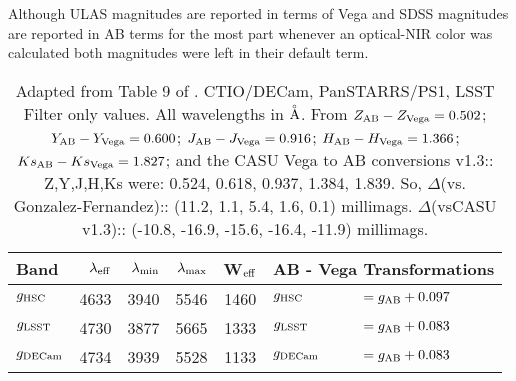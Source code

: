 \documentclass[usenatbib]{mnras}
\begin{document}
    Although ULAS magnitudes are reported in terms of Vega and SDSS
    magnitudes are reported in AB terms for the most part whenever an
    optical-NIR color was calculated both magnitudes were left in their
    default term.
    
\begin{table*}
  \begin{center}
   \caption{Adapted from Table 9 of \citet{Peth2011}. 
CTIO/DECam, PanSTARRS/PS1, LSST
Filter only values. 
All wavelengths in ${\buildrel _{\circ} \over {\mathrm{A}}}$. 
From \citet{GonzalezFernandez2018} 
$Z_{\rm AB}   -  Z_{\rm Vega}  = 0.502$;  
$Y_{\rm AB}  -  Y_{\rm Vega}    = 0.600 $;
$J_{\rm AB}   -  J_{\rm Vega}    = 0.916  $;
$H_{\rm AB}  -  H_{\rm Vega}    = 1.366 $;
$Ks_{\rm AB}  -  Ks_{\rm Vega}  = 1.827 $;
and the CASU Vega to AB conversions v1.3:: 
	Z,Y,J,H,Ks were: 0.524, 0.618, 0.937, 1.384, 1.839. 
So, $\Delta$(vs. Gonzalez-Fernandez)::
	(11.2,     1.1,    5.4,     1.6,    0.1) millimags. 
$\Delta$(vsCASU v1.3)::
	(-10.8, -16.9, -15.6,  -16.4, -11.9) millimags. 
}
    \setlength{\tabcolsep}{4pt}
     \begin{tabular}{l r r r  c l l}
      \hline
      \hline
      Band & $\lambda_{\rm eff}  $ 
              &  $\lambda_{\rm min} $ 
              & $\lambda_{\rm max} $ 
              & W$_{\rm eff}$
              & \multicolumn{2}{c}{AB - Vega  Transformations} \\
      \hline
       $g_{\rm HSC}$    &  	4633   &     3940     &   5546	&  1460       &    $g_{\rm HSC}$         &$  = g_{\rm AB} + 0.097 $ \\
      $g_{\rm LSST}$      &     4730     &	  3877    &	   5665   &  1333   &  $g_{\rm LSST}$       &$ = g_{\rm AB} +  0.083 $ \\   %
      $g_{\rm DECam}$  &      4734     &   3939    &    5528   &   1133        &  $g_{\rm DECam} $    &$  = g_{\rm AB} + 0.083 $ \\	     

\end{tabular}
\end{center}
\end{table*}
\end{document}
